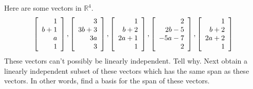 \begin{enumialphparenastyle}
\begin{ex} Here are some vectors in $\mathbb{R}^{4}$. 
\begin{equation*}
\left[ 
\begin{array}{r}
1 \\ 
b+1 \\ 
a \\ 
1
\end{array}
\right] ,\left[ 
\begin{array}{r}
3 \\ 
3b+3 \\ 
3a \\ 
3
\end{array}
\right] ,\left[ 
\begin{array}{r}
1 \\ 
b+2 \\ 
2a+1 \\ 
1
\end{array}
\right] ,\left[ 
\begin{array}{r}
2 \\ 
2b-5 \\ 
-5a-7 \\ 
2
\end{array}
\right] ,\left[ 
\begin{array}{r}
1 \\ 
b+2 \\ 
2a+2 \\ 
1
\end{array}
\right]
\end{equation*}
These vectors can't possibly be linearly independent. Tell why. Next obtain a
linearly independent subset of these vectors which has the same span as
these vectors. In other words, find a basis for the span of these vectors.
\end{ex}

\end{enumialphparenastyle}